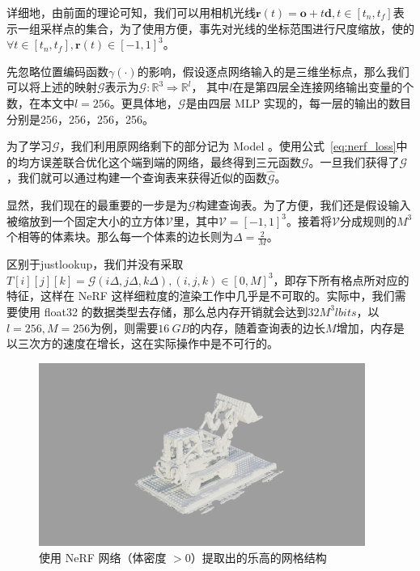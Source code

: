 详细地，由前面的理论可知，我们可以用相机光线$\symbf{r}\left(t\right) = \symbf{o} + t \symbf{d}, t \in \left[t_n, t_f\right]$表示一组采样点的集合，为了使用方便，事先对光线的坐标范围进行尺度缩放，使的
$\forall t \in  \left[t_n, t_f\right], \symbf{r}\left(t\right) \in \left[-1, 1\right]^3$。

先忽略位置编码函数$\gamma\left(\cdot\right)$的影响，假设逐点网络输入的是三维坐标点，那么我们可以将上述的映射$\mathcal{G}$表示为$\mathcal{G}: \mathbb{R}^3 \Rightarrow \mathbb{R}^l$， 其中$l$在是第四层全连接网络输出变量的个数，在本文中$l = 256$。更具体地，$\mathcal{G}$是由四层 MLP 实现的，每一层的输出的数目分别是256，256，256，256。

为了学习$\mathcal{G}$，我们利用原网络剩下的部分记为 Model 。使用公式~\ref{eq:nerf_loss}中的均方误差联合优化这个端到端的网络，最终得到三元函数$\mathcal{G}$。一旦我们获得了$\mathcal{G}$，我们就可以通过构建一个查询表来获得近似的函数$\hat{\mathcal{G}}$。

显然，我们现在的最重要的一步是为$\mathcal{G}$构建查询表。为了方便，我们还是假设输入被缩放到一个固定大小的立方体$\mathcal{V}$里，其中$\mathcal{V} = \left[-1, 1\right]^3$。接着将$\mathcal{V}$分成规则的$M^3$个相等的体素块。那么每一个体素的边长则为$\Delta = \frac{2}{M}$。

区别于justlookup\cite{lin2019justlookup}，我们并没有采取$T\left[i\right]\left[j\right]\left[k\right] = \mathcal{G}\left(i\Delta, j\Delta, k\Delta\right), \left(i, j, k\right) \in \left[0, M\right]^3$，即存下所有格点所对应的特征，这样在 NeRF 这样细粒度的渲染工作中几乎是不可取的。实际中，我们需要使用 float32 的数据类型去存储，那么总内存开销就会达到$32M^{3}l bits$，以$l = 256, M = 256$为例，则需要$\SI{16}{GB}$的内存，随着查询表的边长$M$增加，内存是以三次方的速度在增长，这在实际操作中是不可行的。

\begin{figure}[b]
    \centering
    \includegraphics[width=0.95\textwidth]{figures/legomesh_gray_complete.png}
    \caption{使用 NeRF 网络（体密度 $> 0$）提取出的乐高的网格结构}
    \label{fig:lego_mesh}
\end{figure}

